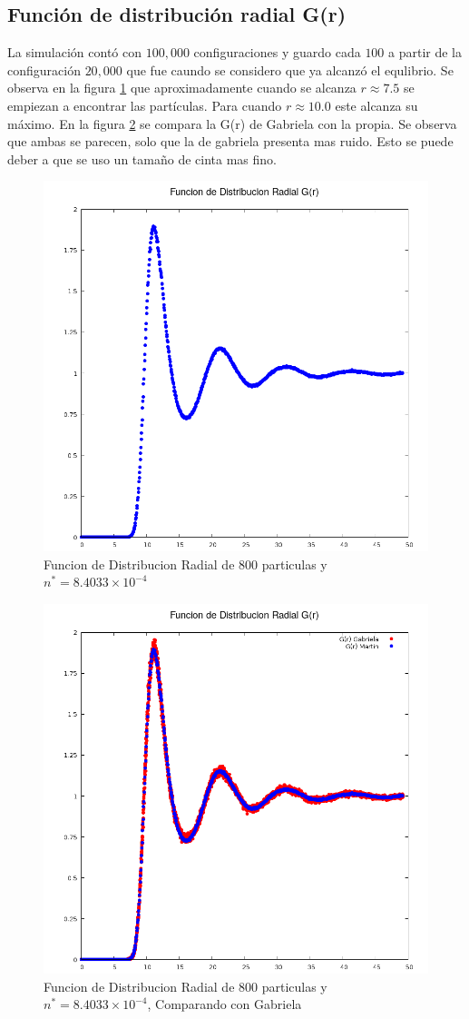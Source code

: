 \documentclass[12pt,letterpaper]{article}
\begin{document}
\subsection*{Función de distribución radial G(r)}
La simulación contó con $100,000$ configuraciones y guardo cada $100$ a partir de la configuración $20,000$ que fue caundo se considero que ya alcanzó el equlibrio. Se observa en la figura \ref{gdr} que aproximadamente cuando se alcanza $r\approx 7.5$ se empiezan a encontrar las partículas. Para cuando $r\approx 10.0$ este alcanza su máximo. En la figura \ref{gdr_Comp} se compara la G(r) de Gabriela con la propia.  Se observa que ambas se parecen, solo que la de gabriela presenta mas ruido. Esto se puede deber a que se uso un tamaño de cinta mas fino.

\begin{figure}[H]
	\centering
	\includegraphics[width=0.75\linewidth]{gdrMartin.png}
	\caption{Funcion de Distribucion Radial de 800 particulas y $n^* = 8.4033\times 10^{-4}$ }
	\label{gdr}
\end{figure}
\begin{figure}[H]
	\centering
	\includegraphics[width=0.75\linewidth]{GdrComparacion.png}
	\caption{Funcion de Distribucion Radial de 800 particulas y $n^* = 8.4033\times 10^{-4}$, Comparando con Gabriela}
	\label{gdr_Comp}
\end{figure}
\end{document}
